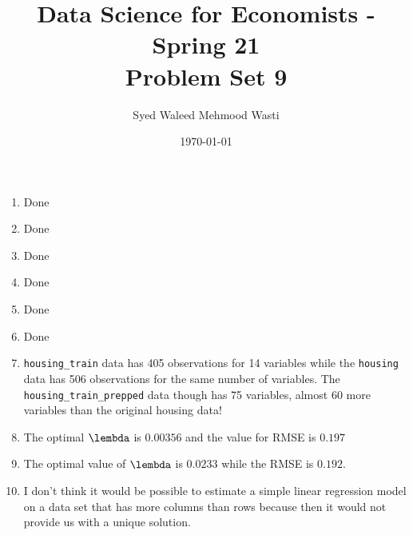 \documentclass[12pt]{article}
\title{\textbf{Data Science for Economists - Spring 21 \\
\vspace{0.5cm}
Problem Set 9}}
\author{Syed Waleed Mehmood Wasti}
\date{\today}
\begin{document}
\begin{titlepage}
\maketitle
\thispagestyle{empty}
\end{titlepage}


\begin{enumerate}


\item
Done

\item
Done

\item
Done

\item
Done

\item
Done


\item
Done

\item
\verb|housing_train| data has 405 observations for 14 variables while the \verb|housing| data has 506 observations for the same number of variables. The \verb|housing_train_prepped| data though has 75 variables, almost 60 more variables than the original housing data!

\item
The optimal $\lembda$ is $0.00356$ and the value for RMSE is $0.197$

\item
The optimal value of $\lembda$ is $0.0233$ while the RMSE is $0.192$.


\item
I don't think it would be possible to estimate a simple linear regression model on a data set that has more columns than rows because then it would not provide us with a unique solution. 



\end{enumerate}
\end{document}
